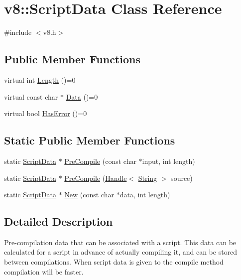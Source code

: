 \hypertarget{classv8_1_1_script_data}{}\section{v8\+:\+:Script\+Data Class Reference}
\label{classv8_1_1_script_data}


{\ttfamily \#include $<$v8.\+h$>$}

\subsection*{Public Member Functions}
\begin{DoxyCompactItemize}
\item 
virtual int \hyperlink{classv8_1_1_script_data_a6aa1007dfe6b09a5e59443bb1afff0b9}{Length} ()=0
\item 
virtual const char $\ast$ \hyperlink{classv8_1_1_script_data_aae01a4e977988fa8338d11d87b572cfa}{Data} ()=0
\item 
virtual bool \hyperlink{classv8_1_1_script_data_ab5cea77b299b7dd73b7024fb114fd7e4}{Has\+Error} ()=0
\end{DoxyCompactItemize}
\subsection*{Static Public Member Functions}
\begin{DoxyCompactItemize}
\item 
static \hyperlink{classv8_1_1_script_data}{Script\+Data} $\ast$ \hyperlink{classv8_1_1_script_data_a4bb3cdd4abbde99a000a0c25b6357520}{Pre\+Compile} (const char $\ast$input, int length)
\item 
static \hyperlink{classv8_1_1_script_data}{Script\+Data} $\ast$ \hyperlink{classv8_1_1_script_data_ad1e46f2a1e84ae151b295f3c74c71787}{Pre\+Compile} (\hyperlink{classv8_1_1_handle}{Handle}$<$ \hyperlink{classv8_1_1_string}{String} $>$ source)
\item 
static \hyperlink{classv8_1_1_script_data}{Script\+Data} $\ast$ \hyperlink{classv8_1_1_script_data_a642fc06a9615387f9ac80f264758cc70}{New} (const char $\ast$data, int length)
\end{DoxyCompactItemize}


\subsection{Detailed Description}
Pre-\/compilation data that can be associated with a script. This data can be calculated for a script in advance of actually compiling it, and can be stored between compilations. When script data is given to the compile method compilation will be faster. 

